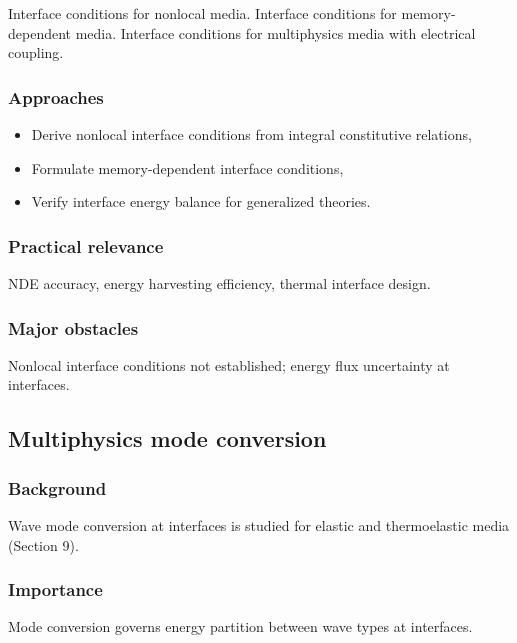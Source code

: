 Interface conditions for nonlocal media. Interface conditions for memory-dependent media. Interface conditions for multiphysics media with electrical coupling.

\subsubsection{Approaches}

\begin{itemize}
\item Derive nonlocal interface conditions from integral constitutive relations,
\item Formulate memory-dependent interface conditions,
\item Verify interface energy balance for generalized theories.
\end{itemize}

\subsubsection{Practical relevance}

NDE accuracy, energy harvesting efficiency, thermal interface design.

\subsubsection{Major obstacles}

Nonlocal interface conditions not established; energy flux uncertainty at interfaces.

\subsection{Multiphysics mode conversion}
\label{sec:multiphysics-mode-conversion}

\subsubsection{Background}

Wave mode conversion at interfaces is studied for elastic and thermoelastic media (Section 9).

\subsubsection{Importance}

Mode conversion governs energy partition between wave types at interfaces.

